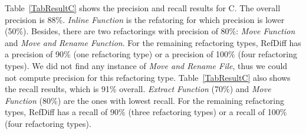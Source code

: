 Table~\ref{TabResultC} shows the precision and recall results for C. The overall precision is 88\%. \textit{Inline Function} is the refatoring for which precision is lower (50\%). Besides, there are two refactorings with precision of 80\%: \textit{Move Function} and \textit{Move and Rename Function}. For the remaining refactoring types, RefDiff has a precision of 90\% (one refactoring type) or a precision of 100\% (four refactoring types).
We did not find any instance of \textit{Move and Rename File}, thus we could not compute precision for this refactoring type.
Table~\ref{TabResultC} also shows the recall results, which is 91\% overall.
\textit{Extract Function} (70\%) and \textit{Move Function} (80\%) are the ones with lowest recall.
For the remaining refactoring types, RefDiff has a recall of 90\% (three refactoring types) or a recall of 100\% (four refactoring types).






